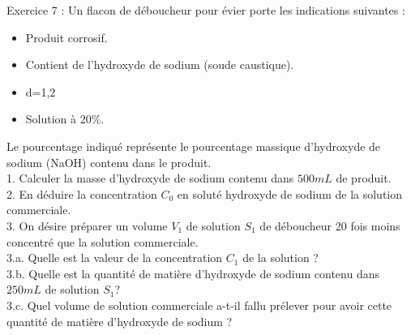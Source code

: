 \documentclass[12pt, french]{article}
\begin{document}
\begin{Box2}{Exercice 7 : }
Un flacon de déboucheur pour évier porte les indications suivantes :
   \begin{itemize}
      \item Produit corrosif.
      \item Contient de l’hydroxyde de sodium (soude caustique).
      \item d=1,2
      \item Solution à 20\%.
   \end{itemize}
Le pourcentage indiqué représente le pourcentage massique d’hydroxyde de sodium (NaOH) contenu dans
le produit.\\
1. Calculer la masse d’hydroxyde de sodium contenu dans $500 mL$ de produit.\\
2. En déduire la concentration $C_0$ en soluté hydroxyde de sodium de la solution commerciale.\\
3. On désire préparer un volume $V_1$ de solution $S_1$ de déboucheur 20 fois moins concentré que la solution commerciale.\\
3.a. Quelle est la valeur de la concentration $C_1$ de la solution ?\\
3.b. Quelle est la quantité de matière d’hydroxyde de sodium contenu dans $250 mL$ de solution $S_1$?\\
3.c. Quel volume de solution commerciale a-t-il fallu prélever pour avoir cette quantité de matière
d’hydroxyde de sodium ?\\
\end{Box2}
\end{document}
